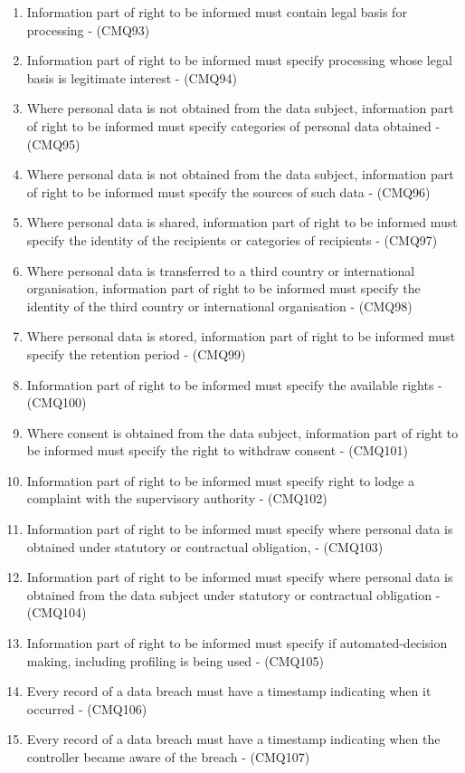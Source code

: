 \begin{enumerate}[label={\textit{C.\theenumi}}]
    \item Information part of right to be informed must contain legal basis for processing - (CMQ93)
    \item Information part of right to be informed must specify processing whose legal basis is legitimate interest - (CMQ94)
    \item Where personal data is not obtained from the data subject, information part of right to be informed must specify categories of personal data obtained - (CMQ95)
    \item Where personal data is not obtained from the data subject, information part of right to be informed must specify the sources of such data - (CMQ96)
    \item Where personal data is shared, information part of right to be informed must specify the identity of the recipients or categories of recipients - (CMQ97)
    \item Where personal data is transferred to a third country or international organisation, information part of right to be informed must specify the identity of the third country or international organisation - (CMQ98)
    \item Where personal data is stored, information part of right to be informed must specify the retention period - (CMQ99)
    \item Information part of right to be informed must specify the available rights - (CMQ100)
    \item Where consent is obtained from the data subject, information part of right to be informed must specify the right to withdraw consent - (CMQ101)
    \item Information part of right to be informed must specify right to lodge a complaint with the supervisory authority - (CMQ102)
    \item Information part of right to be informed must specify where personal data is obtained under statutory or contractual obligation, - (CMQ103)
    \item Information part of right to be informed must specify where personal data is obtained from the data subject under statutory or contractual obligation - (CMQ104)
    \item Information part of right to be informed must specify if automated-decision making, including profiling is being used - (CMQ105)
    \item Every record of a data breach must have a timestamp indicating when it occurred - (CMQ106)
    \item Every record of a data breach must have a timestamp indicating when the controller became aware of the breach - (CMQ107)

\end{enumerate}
